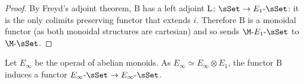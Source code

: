 \begin{refsection}
\begin{proof}
By Freyd's adjoint theorem, $\mathrm{B}$ has a left adjoint $\mathrm{L} \colon \sSet \to E_1 \textrm{-} \sSet$: it is the only colimits preserving functor that extends $i$. Therefore $\mathrm{B}$ is a monoidal functor (as both monoidal structures are cartesian) and so sends $\M \textrm{-} E_1 \textrm{-} \sSet$ to $\M \textrm{-} \sSet$.
\end{proof}

\begin{corollary}
Let $E_{\infty}$ be the operad of abelian monoids. As $E_{\infty} \simeq E_{\infty} \otimes E_1$, the functor $\mathrm{B}$ induces a functor $E_{\infty} \textrm{-} \sSet \to E_{\infty} \textrm{-} \sSet$.
\end{corollary}

\printbibliography[heading = local]

\end{refsection}
